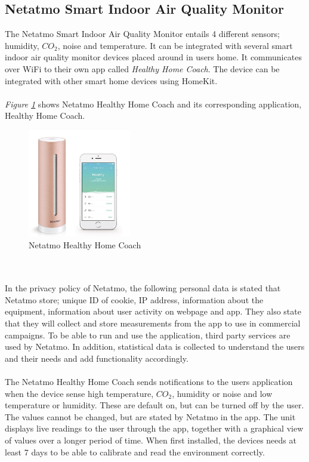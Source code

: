 \subsection{Netatmo Smart Indoor Air Quality Monitor}
The Netatmo Smart Indoor Air Quality Monitor entails 4 different sensors; humidity, \(CO_2\), noise and temperature. It can be integrated with several smart indoor air quality monitor devices placed around in users home. It communicates over WiFi to their own app called \textit{Healthy Home Coach}. The device can be integrated with other smart home devices using HomeKit. 
\\\\
\textit{Figure \ref{fig:Netatmo}} shows Netatmo Healthy Home Coach and its corresponding application, Healthy Home Coach. 
\begin{figure} [!ht]
    \centering
    \includegraphics[width=0.4\textwidth]{figures/Netatmo.png}
    \caption{Netatmo Healthy Home Coach \cite{NetatmoDevice}}
    \label{fig:Netatmo}
\end{figure}
\\\\
In the privacy policy of Netatmo, the following personal data is stated that Netatmo store; unique ID of cookie, IP address, information about the equipment, information about user activity on webpage and app. They also state that they will collect and store measurements from the app to use in commercial campaigns. To be able to run and use the application, third party services are used by Netatmo. In addition, statistical data is collected to understand the users and their needs and add functionality accordingly.  
\\\\
The Netatmo Healthy Home Coach sends notifications to the users application when the device sense high temperature, \(CO_2\), humidity or noise and low temperature or humidity. These are default on, but can be turned off by the user. The values cannot be changed, but are stated by Netatmo in the app. The unit displays live readings to the user through the app, together with a graphical view of values over a longer period of time. When first installed, the devices needs at least 7 days to be able to calibrate and read the environment correctly. 
